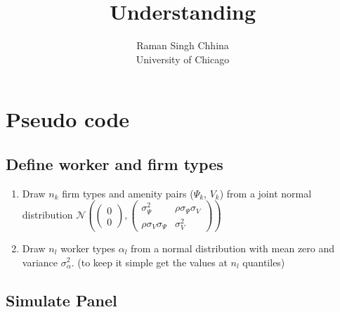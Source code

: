 \documentclass{report}
\title{Understanding \cite{sorkin2018ranking}}
\author{
Raman Singh Chhina \\ {University of Chicago}
}
\date{}
\numberwithin{equation}{section}
\numberwithin{figure}{section}
\numberwithin{table}{section}
\begin{document}
\maketitle

\renewcommand{\thechapter}{\Alph{chapter}}
\setcounter{tocdepth}{1}
\tableofcontents
\etocsettocstyle{}{} %

\clearpage

\section{Pseudo code}

\subsection{Define worker and firm types}

\begin{enumerate}
  \item Draw $n_k$ firm types and amenity pairs  ($\Psi_k$, $V_k$) from a joint normal distribution $\mathcal N \left( \begin{pmatrix}
    0 \\
    0
  \end{pmatrix}, \begin{pmatrix}
    \sigma^2_{\Psi} & \rho \sigma_{\Psi} \sigma_{V}  \\
    \rho \sigma_{V} \sigma_{\Psi} & \sigma^2_{V}
  \end{pmatrix} \right)$
  \item Draw $n_l$ worker types $\alpha_l$ from a normal distribution with mean zero and variance $\sigma^2_{\alpha}$. (to keep it simple get the values at $n_l$ quantiles)
\end{enumerate}

\subsection{Simulate Panel}
\end{document}
